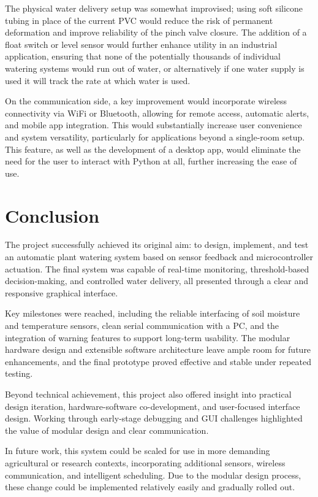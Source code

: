 \documentclass[a4paper,11pt]{article}
\begin{document}
The physical water delivery setup was somewhat improvised; 
using soft silicone tubing in place of the current PVC would reduce the risk of 
permanent deformation and improve reliability of the pinch valve closure. 
The addition of a float switch or level sensor would further enhance
utility in an industrial application,
ensuring that none of the potentially thousands of individual watering systems
would run out of water, 
or alternatively if one water supply is used it will track the rate at which
water is used.

On the communication side, a key improvement would incorporate 
wireless connectivity via WiFi or Bluetooth, 
allowing for remote access, automatic alerts, and mobile app integration. 
This would substantially increase user convenience and system versatility, 
particularly for applications beyond a single-room setup.
This feature, as well as the development of a desktop app,
would eliminate the need for the user to interact with Python at all,
further increasing the ease of use.

\section{Conclusion}
\label{sec:conclusion}

The project successfully achieved its original aim: to design, implement, 
and test an automatic plant watering system based on sensor feedback and 
microcontroller actuation. The final system was capable of real-time 
monitoring, threshold-based decision-making, and controlled water delivery, 
all presented through a clear and responsive graphical interface.

Key milestones were reached, including the reliable interfacing of 
soil moisture and temperature sensors, clean serial communication with 
a PC, and the integration of warning features to support 
long-term usability. The modular hardware design and extensible software 
architecture leave ample room for future enhancements, and the final 
prototype proved effective and stable under repeated testing.

Beyond technical achievement, this project also offered insight into 
practical design iteration, hardware-software co-development, and 
user-focused interface design. Working through early-stage debugging 
and GUI challenges highlighted the value of modular design and 
clear communication.

In future work, this system could be scaled for use in more demanding 
agricultural or research contexts, incorporating additional sensors, 
wireless communication, and intelligent scheduling.
Due to the modular design process,
these change could be implemented relatively easily and 
gradually rolled out.
\end{document}
